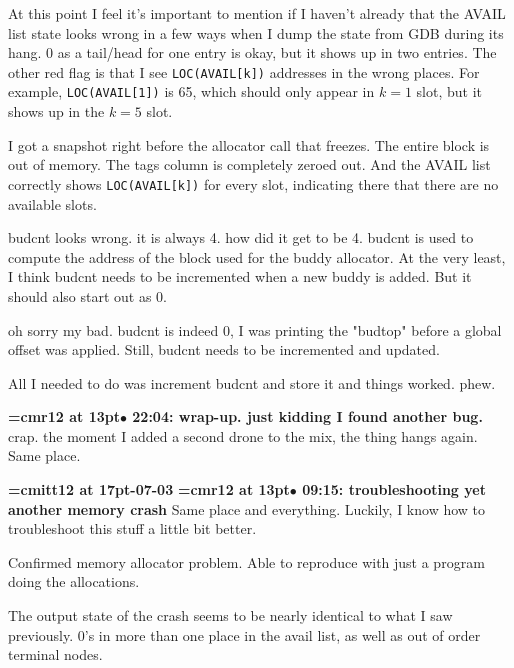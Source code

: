 At this point I feel it's important to mention if I haven't already that the AVAIL list state looks wrong in a few ways when I dump the state from GDB during its hang. 0 as a tail/head for one entry is okay, but it shows up in two entries. The other red flag is that I see {\tt LOC(AVAIL[k])} addresses in the wrong places. For example, {\tt LOC(AVAIL[1])} is 65, which should only appear in $k=1$ slot, but it shows up in the $k=5$ slot.
\par

I got a snapshot right before the allocator call that freezes. The entire block is out of memory. The tags column is completely zeroed out. And the AVAIL list correctly shows {\tt LOC(AVAIL[k])} for every slot, indicating there that there are no available slots.
\par

budcnt looks wrong. it is always 4. how did it get to be 4. budcnt is used to compute the address of the block used for the buddy allocator. At the very least, I think budcnt needs to be incremented when a new buddy is added. But it should also start out as 0.
\par

oh sorry my bad. budcnt is indeed 0, I was printing the "budtop" before a global offset was applied. Still, budcnt needs to be incremented and updated.
\par

All I needed to do was increment budcnt and store it and things worked. phew.
\par

{\smallskip\noindent\bf\font\titlefont=cmr12 at 13pt\titlefont $\bullet$ 22:04: wrap-up. just kidding I found another bug.}\smallskip
crap. the moment I added a second drone to the mix, the thing hangs again. Same place.
\par

{\medskip\noindent\bf\font\titlefont=cmitt12 at 17pt-07-03}\medskip
{\smallskip\noindent\bf\font\titlefont=cmr12 at 13pt\titlefont $\bullet$ 09:15: troubleshooting yet another memory crash}\smallskip
Same place and everything. Luckily, I know how to troubleshoot this stuff a little bit better.
\par

Confirmed memory allocator problem. Able to reproduce with just a program doing the allocations.
\par

The output state of the crash seems to be nearly identical to what I saw previously. 0's in more than one place in the avail list, as well as out of order terminal nodes.
\par

